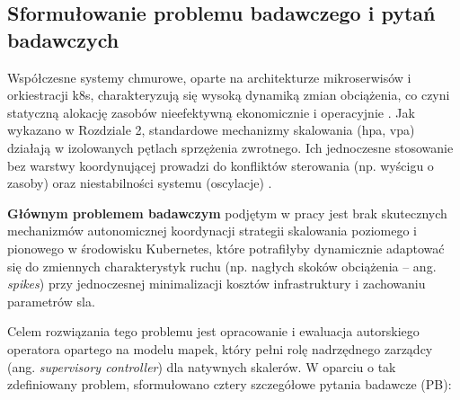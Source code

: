 % 
% 
% 


\subsection{Sformułowanie problemu badawczego i pytań badawczych}
\label{subsec:problem_badawczy}

Współczesne systemy chmurowe, oparte na architekturze mikroserwisów i orkiestracji \gls{k8s}, charakteryzują 
się wysoką dynamiką zmian obciążenia, co czyni statyczną alokację zasobów nieefektywną ekonomicznie i 
operacyjnie \cite{burns2019kubernetes}. Jak wykazano w Rozdziale 2, standardowe mechanizmy skalowania 
(\gls{hpa}, \gls{vpa}) działają w izolowanych pętlach sprzężenia zwrotnego. Ich jednoczesne stosowanie bez 
warstwy koordynującej prowadzi do konfliktów sterowania (np. wyścigu o zasoby) oraz niestabilności systemu 
(oscylacje) \cite{lorido2014review}.

\textbf{Głównym problemem badawczym} podjętym w pracy jest brak skutecznych mechanizmów autonomicznej koordynacji 
strategii skalowania poziomego i pionowego w środowisku Kubernetes, które potrafiłyby dynamicznie adaptować się 
do zmiennych charakterystyk ruchu (np. nagłych skoków obciążenia -- ang. \textit{spikes}) przy jednoczesnej 
minimalizacji kosztów infrastruktury i zachowaniu parametrów \gls{sla}.

Celem rozwiązania tego problemu jest opracowanie i ewaluacja autorskiego operatora opartego na modelu 
\gls{mapek}, który pełni rolę nadrzędnego zarządcy (ang. \textit{supervisory controller}) dla natywnych skalerów.
W oparciu o tak zdefiniowany problem, sformułowano cztery szczegółowe pytania badawcze (PB):

